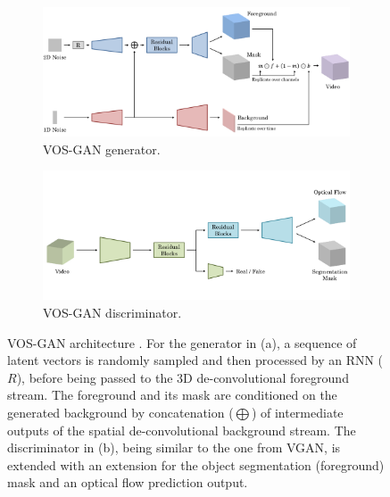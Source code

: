 \begin{figure}
  \centering	
	\begin{subfigure}{\textwidth}
    \centering
    \includegraphics[width=1\textwidth]{graphics/gan/vosgan/vosgan_g.pdf}
    \caption{VOS-GAN generator.}
    \label{subfig:vosgan_g}
  \end{subfigure}
 
	\begin{subfigure}{\textwidth}
    \centering
    \includegraphics[width=1\textwidth]{graphics/gan/vosgan/vosgan_d.pdf}
    \caption{VOS-GAN discriminator.}
    \label{subfig:vosgan_d}
  \end{subfigure}

  \caption[VOS-GAN architecture.]{VOS-GAN architecture \cite{spampinato2019adversarial}. For the generator in (a), a sequence of latent vectors is randomly sampled and then processed by an RNN ($R$), before being passed to the 3D de-convolutional foreground stream. The foreground and its mask are conditioned on the generated background by concatenation ($\bigoplus$) of intermediate outputs of the spatial de-convolutional background stream. The discriminator in (b), being similar to the one from VGAN, is extended with an extension for the object segmentation (foreground) mask and an optical flow prediction output.}
  \label{fig:vos_gan}
\end{figure}

